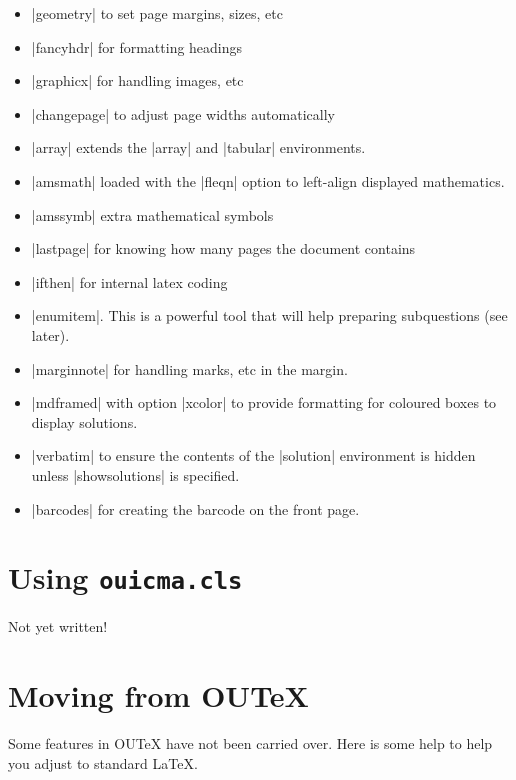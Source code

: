 \documentclass[a4paper]{ltxguide}
\newcommand\3{\unskip\enspace\fbox{\fontsize{4}{4}\selectfont NEW 3.0}}
\begin{document}
\begin{itemize}
\item |geometry| to set page margins, sizes, etc
\item |fancyhdr| for formatting headings
\item |graphicx| for handling images, etc
\item |changepage| to adjust page widths automatically
\item |array| extends the |array| and |tabular| environments.
\item |amsmath| loaded with the |fleqn| option to left-align displayed mathematics.
\item |amssymb| extra mathematical symbols
\item |lastpage| for knowing how many pages the document contains
\item |ifthen| for internal latex coding
\item |enumitem|. This is a powerful tool that will help preparing subquestions (see later).
\item |marginnote| for handling marks, etc in the margin.
\item |mdframed| with option |xcolor| to provide formatting for coloured boxes to display solutions.
\item |verbatim| to ensure the contents of the |solution| environment is hidden unless |showsolutions| is specified.
\item |barcodes| for creating the barcode on the front page. 
\end{itemize}

%
%
%
%
%
%
%
%
%
%
\section{Using \texttt{ouicma.cls}}
Not yet written!

%
%
%
%
%
%
%
%
%
%
\section{Moving from OUTeX}

Some features in OUTeX have not been carried over. Here is some help to help you adjust to standard \LaTeX.
\end{document}
